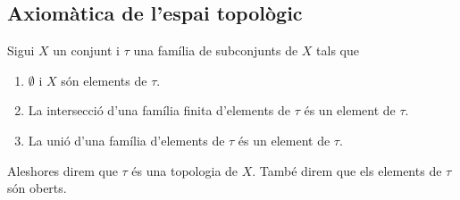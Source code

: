 \documentclass[../Apunts.tex]{subfiles}
\begin{document}
	\subsection{Axiomàtica de l'espai topològic}
	\begin{definition}[Topologia]	%
		\label{def:topologia}
		\label{def:oberts topologia}
		Sigui \(X\) un conjunt i \(\tau\) una família de subconjunts de \(X\) tals que
		\begin{enumerate}
		\item \(\emptyset\) i \(X\) són elements de \(\tau\).
		\item La intersecció d'una família finita d'elements de \(\tau\) és un element de \(\tau\).
		\item La unió d'una família d'elements de \(\tau\) és un element de \(\tau\).
		\end{enumerate}
		Aleshores direm que \(\tau\) és una topologia de \(X\). També direm que els elements de \(\tau\) són oberts.
	\end{definition}
\end{document}
